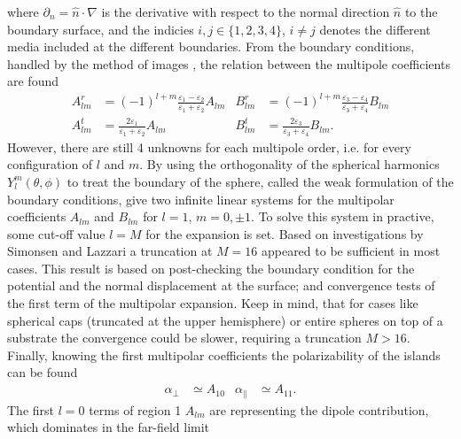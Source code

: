 where $\partial_n = \hat{n} \cdot \nabla$ is the derivative with respect to the 
normal direction $\hat{n}$ to the boundary surface, and the indicies $i,j \in \{1,2,3,4\}$, $i \neq j$
denotes the different media included at the different boundaries.
%
From the boundary conditions, handled by the method of images \cite[p.~121]{Griffiths},
the relation between the multipole coefficients are found
%
\begin{subequations}
\label{multExpCoeff1}
\begin{align}
   A^r_{lm} & = (-1)^{l+m} \frac{\varepsilon_1 - \varepsilon_2}{\varepsilon_1 + \varepsilon_2} A_{lm}
   \label{multExpCoeffAr}\\
%
   A^t_{lm} & = \frac{2\varepsilon_1}{\varepsilon_1 + \varepsilon_2} A_{lm}
   \label{multExpCoeffAt}
\end{align}
\label{multExpCoeff2}
\begin{align}
   B^r_{lm} & = (-1)^{l+m} \frac{\varepsilon_3 - \varepsilon_4}{\varepsilon_3 + \varepsilon_4} B_{lm}
   \label{multExpCoeffBr}\\
%
   B^t_{lm} & = \frac{2\varepsilon_3}{\varepsilon_3 + \varepsilon_4} B_{lm}.
   \label{multExpCoeffAt}
\end{align}
\end{subequations}
%
However, there are still 4 unknowns for each multipole order, i.e. for every configuration of $l$ and $m$.
By using the orthogonality of the spherical harmonics $Y_l^m(\theta,\phi)$ to treat the boundary
of the sphere, called the weak formulation of the boundary conditions, give two infinite linear 
systems for the multipolar coefficients $A_{lm}$ and $B_{lm}$ for $l = 1$, $m = 0, \pm 1$.
To solve this system in practive, some cut-off value $l = M$ for the expansion is set. 
Based on investigations by Simonsen and Lazzari \cite{Simonsen2000}
a truncation at $M = 16$ appeared to be sufficient in most cases. This result is based on 
post-checking the boundary condition for the potential and the normal displacement at the surface;
and convergence tests of the first term of the multipolar expansion. Keep in mind, that for 
cases like spherical caps (truncated at the upper hemisphere) or entire spheres on top of a substrate
the convergence could be slower, requiring a truncation $M>16$.
Finally, knowing the first multipolar coefficients the polarizability of the islands can be found
\begin{align}
   \alpha_{\perp} &\simeq A_{10}          &\alpha_{\parallel} &\simeq A_{11}.
\end{align}
The first $l=0$ terms of region 1 $A_{lm}$ are representing the dipole contribution, which dominates
in the far-field limit \cite[p.~99]{BedeauxVliegerBook} 

